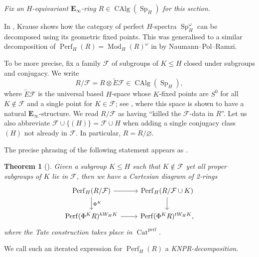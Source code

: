\documentclass[11pt, a4paper]{article}
\newcommand{\perf}{\mathrm{perf}}
\newcommand{\1}{\mathbf{1}}
\DeclareMathOperator{\CAlg}{CAlg}
\DeclareMathOperator{\Cat}{Cat}
\DeclareMathOperator{\Mod}{Mod}
\DeclareMathOperator{\Perf}{Perf}
\DeclareMathOperator{\Sp}{Sp}
\newcommand{\tildE}{\widetilde{E}}
\newcommand{\E}{\mathbf{E}}
\newcommand{\calF}{\mathcal{F}}
\theoremstyle{plain}
\newtheorem{theorem}[equation]{Theorem}\numberwithin{equation}{section}
\theoremstyle{definition}
\theoremstyle{remark}\numberwithin{equation}{section}
\begin{document}
\begin{center}
    \emph{Fix an $H$-equivariant $\E_\infty$-ring $R \in \CAlg(\Sp_H)$ for this section.}
\end{center}

In \cite{krause_equivariantpicard}, Krause shows how the category of perfect $H$-spectra $\Sp^\omega_H$ can be decomposed using its geometric fixed points. This was generalised to a similar decomposition of $\Perf_H(R) = \Mod_H(R)^\omega$ in \cite{NPR2024} by Naumann--Pol--Ramzi. 

To be more precise, fix a family $\calF$ of subgroups of $K\leq H$ closed under subgroups and conjugacy. We write
\[R /\calF = R \otimes \tildE \calF \in \CAlg(\Sp_H),\]
where $\tildE \calF$ is the universal based $H$-space whose $K$-fixed points are $S^0$ for all $K\notin \calF$ and a single point for $K\in \calF$; see \cite[]{nilpotenceanddescentinequivariant}, where this space is shown to have a natural $\E_\infty$-structure. We read $R/\calF$ as having ``killed the $\calF$-data in $R$''. Let us also abbreviate $\calF \cup \{(H)\} = \calF \cup H$ when adding a single conjugacy class $(H)$ not already in $\calF$. In particular, $R=R/\varnothing$.

The precise phrasing of the following statement appears as \cite[Thm.8.2]{equivariant_separable_algebras_NPR2}.

\begin{theorem}[{\cite[Thm.7.13]{NPR2024}}]\label{thm:npr_decompositions}
    Given a subgroup $K\leq H$ such that $K\notin \calF$ yet all proper subgroups of $K$ lie in $\calF$, then we have a Cartesian diagram of 2-rings
    \[\begin{tikzcd}
        {\Perf_H(R / \calF)}\ar[r]\ar[d, "{\Phi^K}"]   &   {\Perf_H(R / \calF \cup K)}\ar[d]   \\
        {\Perf(\Phi^K R)^{hW_H K}}\ar[r]    &   {\Perf(\Phi^K R)^{tW_H K},}
    \end{tikzcd}\]
    where the Tate construction takes place in $\Cat^\perf$.
\end{theorem}

We call such an iterated expression for $\Perf_H(R)$ a \emph{KNPR-decomposition}.
\end{document}

